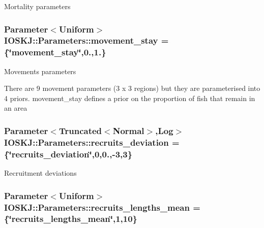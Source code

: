 Mortality parameters \hypertarget{classIOSKJ_1_1Parameters_ab82e4c48509a372fde55b33e0a5823e6}{
\subsubsection[{movement\-\_\-stay}]{\setlength{\rightskip}{0pt plus 5cm}Parameter$<$Uniform$>$ I\-O\-S\-K\-J\-::\-Parameters\-::movement\-\_\-stay = \{\char`\"{}movement\-\_\-stay\char`\"{},0.,1.\}}}\label{classIOSKJ_1_1Parameters_ab82e4c48509a372fde55b33e0a5823e6}
Movements parameters

There are 9 movement parameters (3 x 3 regions) but they are parameterised into 4 priors. {\ttfamily movement\-\_\-stay} defines a prior on the proportion of fish that remain in an area \hypertarget{classIOSKJ_1_1Parameters_a083c2112ccc41ef2b0788feb08bee150}{
\subsubsection[{recruits\-\_\-deviation}]{\setlength{\rightskip}{0pt plus 5cm}Parameter$<$Truncated$<$Normal$>$,Log$>$ I\-O\-S\-K\-J\-::\-Parameters\-::recruits\-\_\-deviation = \{\char`\"{}recruits\-\_\-deviation\char`\"{},0,0.,-\/3,3\}}}\label{classIOSKJ_1_1Parameters_a083c2112ccc41ef2b0788feb08bee150}
Recruitment deviations \hypertarget{classIOSKJ_1_1Parameters_acb9ab0f89f7ceec2e8301862f0f594ec}{
\subsubsection[{recruits\-\_\-lengths\-\_\-mean}]{\setlength{\rightskip}{0pt plus 5cm}Parameter$<$Uniform$>$ I\-O\-S\-K\-J\-::\-Parameters\-::recruits\-\_\-lengths\-\_\-mean = \{\char`\"{}recruits\-\_\-lengths\-\_\-mean\char`\"{},1,10\}}}\label{classIOSKJ_1_1Parameters_acb9ab0f89f7ceec2e8301862f0f594ec}
